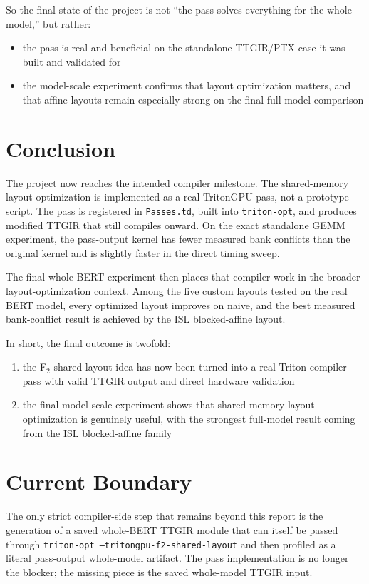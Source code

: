 \documentclass[11pt,a4paper]{article}
\begin{document}
So the final state of the project is not ``the pass solves everything for the
whole model,'' but rather:

\begin{itemize}
\item the pass is real and beneficial on the standalone TTGIR/PTX case it was
      built and validated for
\item the model-scale experiment confirms that layout optimization matters, and
      that affine layouts remain especially strong on the final full-model
      comparison
\end{itemize}

\section{Conclusion}

The project now reaches the intended compiler milestone.  The shared-memory
layout optimization is implemented as a real TritonGPU pass, not a prototype
script.  The pass is registered in \texttt{Passes.td}, built into
\texttt{triton-opt}, and produces modified TTGIR that still compiles onward.
On the exact standalone GEMM experiment, the pass-output kernel has fewer
measured bank conflicts than the original kernel and is slightly faster in the
direct timing sweep.

The final whole-BERT experiment then places that compiler work in the broader
layout-optimization context.  Among the five custom layouts tested on the real
BERT model, every optimized layout improves on naive, and the best measured
bank-conflict result is achieved by the ISL blocked-affine layout.

In short, the final outcome is twofold:

\begin{enumerate}
\item the F$_2$ shared-layout idea has now been turned into a real Triton
      compiler pass with valid TTGIR output and direct hardware validation
\item the final model-scale experiment shows that shared-memory layout
      optimization is genuinely useful, with the strongest full-model result
      coming from the ISL blocked-affine family
\end{enumerate}

\section*{Current Boundary}

The only strict compiler-side step that remains beyond this report is the
generation of a saved whole-BERT TTGIR module that can itself be passed
through \texttt{triton-opt --tritongpu-f2-shared-layout} and then profiled as a
literal pass-output whole-model artifact.  The pass implementation is no longer
the blocker; the missing piece is the saved whole-model TTGIR input.
\end{document}
